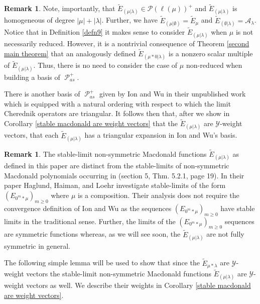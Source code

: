 \documentclass[11pt]{article}
\theoremstyle{definition}
\newtheorem{rema}[theo]{Remark}
\numberwithin{equation}{section}
\newcommand{\y}{{ \mathscr{Y} }}
\DeclareMathOperator{\sP}{\mathscr{P} }
\begin{document}
\begin{rema}
     Note, importantly, that $\widetilde{E}_{(\mu|\lambda)} \in \mathscr{P}(\ell(\mu))^{+}$ and $\widetilde{E}_{(\mu|\lambda)}$ is homogeneous of degree $|\mu| + |\lambda|$. Further, we have $\widetilde{E}_{(\mu|\emptyset)} = \widetilde{E}_{\mu}  $ and $\widetilde{E}_{(\emptyset |\lambda)} = \mathcal{A}_{\lambda}$. Notice that in Definition \ref{defn9} it makes sense to consider $\widetilde{E}_{(\mu|\lambda)}$ when $\mu$ is not necessarily reduced. However, it is a nontrivial consequence of Theorem \ref{second main theorem} that an analogously defined $\widetilde{E}_{(\mu*0|\lambda)}$ is a nonzero scalar multiple of $\widetilde{E}_{(\mu|\lambda)}.$ Thus, there is no need to consider the case of $\mu$ non-reduced when building a basis of $\sP_{as}^{+}.$

     There is another basis of $\sP_{as}^{+}$ given by Ion and Wu in their unpublished work \cite{IW_2022} which is equipped with a natural ordering with respect to which the limit Cherednik operators are triangular. It follows then that, after we show in Corollary \ref{stable macdonald are weight vectors} that the $\widetilde{E}_{(\mu|\lambda)}$ are $\y$-weight vectors, that each $\widetilde{E}_{(\mu|\lambda)}$ has a triangular expansion in Ion and Wu's basis.
\end{rema}

\begin{rema}
    The stable-limit non-symmetric Macdonald functions $\widetilde{E}_{(\mu|\lambda)}$ as defined in this paper are distinct from the stable-limits of non-symmetric Macdonald polynomials occurring in \cite{haglund2007combinatorial} (section 5, Thm. 5.2.1, page 19). In their paper Haglund, Haiman, and Loehr investigate stable-limits of the form $(E_{0^m* \mu})_{m \geq 0}$ where $\mu$ is a composition. Their analysis does not require the convergence definition of Ion and Wu as the sequences $(E_{0^m* \mu})_{m \geq 0}$ have stable limits in the traditional sense. Further, the limits of the $(E_{0^m* \mu})_{m \geq 0}$ sequences are symmetric functions whereas, as we will see soon, the $\widetilde{E}_{(\mu|\lambda)}$ are not fully symmetric in general. 
\end{rema}

The following simple lemma will be used to show that since the $\widetilde{E}_{\mu*\lambda}$ are $\y$-weight vectors the stable-limit non-symmetric Macdonald functions $\widetilde{E}_{(\mu|\lambda)}$ are $\y$-weight vectors as well. We describe their weights in Corollary \ref{stable macdonald are weight vectors}.
\end{document}
